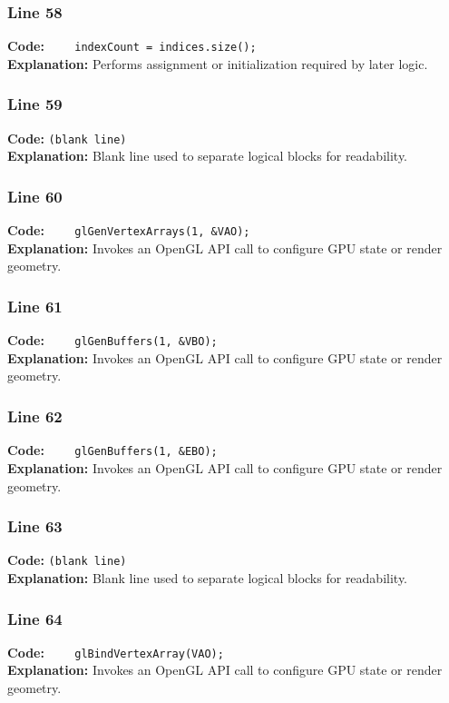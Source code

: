 \documentclass[11pt,a4paper]{article}
\begin{document}
\subsubsection*{Line 58}
\textbf{Code:} \verb|    indexCount = indices.size();|\\
\textbf{Explanation:} Performs assignment or initialization required by later logic.

\subsubsection*{Line 59}
\textbf{Code:} \texttt{(blank line)}\\
\textbf{Explanation:} Blank line used to separate logical blocks for readability.

\subsubsection*{Line 60}
\textbf{Code:} \verb|    glGenVertexArrays(1, &VAO);|\\
\textbf{Explanation:} Invokes an OpenGL API call to configure GPU state or render geometry.

\subsubsection*{Line 61}
\textbf{Code:} \verb|    glGenBuffers(1, &VBO);|\\
\textbf{Explanation:} Invokes an OpenGL API call to configure GPU state or render geometry.

\subsubsection*{Line 62}
\textbf{Code:} \verb|    glGenBuffers(1, &EBO);|\\
\textbf{Explanation:} Invokes an OpenGL API call to configure GPU state or render geometry.

\subsubsection*{Line 63}
\textbf{Code:} \texttt{(blank line)}\\
\textbf{Explanation:} Blank line used to separate logical blocks for readability.

\subsubsection*{Line 64}
\textbf{Code:} \verb|    glBindVertexArray(VAO);|\\
\textbf{Explanation:} Invokes an OpenGL API call to configure GPU state or render geometry.
\end{document}
